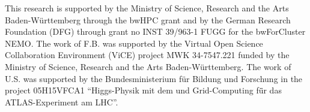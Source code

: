 \begin{acknowledgements}
This research is supported by the Ministry of Science, Research and the Arts Baden-W\"urttemberg through the bwHPC grant
and by the German Research Foundation (DFG) through grant no INST
39/963-1 FUGG for the bwForCluster NEMO.
The work of F.B. was supported by the Virtual Open Science
Collaboration Environment (ViCE) project MWK 34-7547.221 funded by the Ministry of Science, Research and the Arts Baden-W\"urttemberg.
The work of U.S. was supported by  the Bundesministerium f\"ur Bildung und Forschung in the project 05H15VFCA1
``Higgs-Physik mit dem und Grid-Computing f\"ür das ATLAS-Experiment am LHC''.
\end{acknowledgements}


